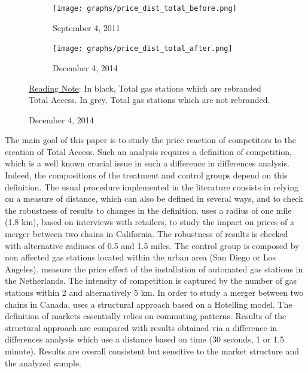 \documentclass[english]{article}
\begin{document}
\begin{figure}[H]
\centering
\caption{Distributions of Total prices before and after rebranding}
\label{fig:price_dist_total_ba}
\begin{subfigure}[t]{.49\columnwidth}
\centering
\texttt{[image: graphs/price\_dist\_total\_before.png]}
\caption[short]{September 4, 2011}
\end{subfigure}
\begin{subfigure}[t]{.49\columnwidth}
\centering
\texttt{[image: graphs/price\_dist\_total\_after.png]}
\caption[short]{December 4, 2014}
\end{subfigure}
\flushleft
{\small{}\uline{Reading Note}}{\small{}: In black, Total gas stations which are rebranded Total Access. In grey, Total gas stations which are not rebranded.}{\small \par}
\end{figure}

\medskip{}

The main goal of this paper is to study the price reaction of competitors to the creation of Total Access. Such an analysis requires a definition of competition, which is a well known crucial issue in such a difference in differences analysis. Indeed, the compositions of the treatment and control groups depend on this definition. The usual procedure implemented in the literature consists in relying on a measure of distance, which can also be defined in several ways, and to check the robustness of results to changes in the definition. \cite{HAS04} uses a radius of one mile (1.8 km), based on interviews with retailers, to study the impact on prices of a merger between two chains in California. The robustness of results is checked with alternative radiuses of 0.5 and 1.5 miles. The control group is composed by non affected gas stations located within the urban area (San Diego or Los Angeles). \cite{BRU15} measure the price effect of the installation of automated gas stations in the Netherlands. The intensity of competition is captured by the number of gas stations within 2 and alternatively 5 km. In order to study a merger between two chains in Canada, \cite{HOU12} uses a structural approach based on a Hotelling model. The definition of markets essentially relies on commuting patterns. Results of the structural approach are compared with results obtained via a difference in differences analysis which use a distance based on time (30 seconds, 1 or 1.5 minute). Results are overall consistent but sensitive to the market structure and the analyzed sample.
\end{document}
